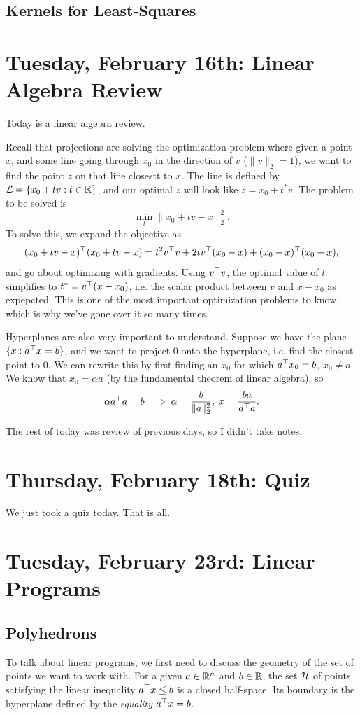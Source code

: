 \documentclass[11 pt]{scrartcl}
\begin{document}
\subsection{Kernels for Least-Squares}


\newpage
\section{Tuesday, February 16th: Linear Algebra Review}
Today is a linear algebra review.

Recall that projections are solving the optimization problem where given a point $x$, and some line going through $x_0$ in the direction of $v$ ($\|v\|_2 = 1$), we want to find the point $z$ on that line closestt to $x$. 
The line is defined by $\mathcal L = \{x_0 + tv : t\in \mathbb R\}$, and our optimal $z$ will look like $z = x_0 + t^* v$. 
The problem to be solved is 
\[ \min_t \|x_0 + tv - x\|_2^2.\] 
To solve this, we expand the objective as 
\[ (x_0+tv - x)^\top (x_0 + tv - x) =  t^2 v^\top v + 2tv^\top (x_0-x) + (x_0-x)^\top (x_0 - x) ,\]
and go about optimizing with gradients. 
Using $v^\top v$, the optimal value of $t$ simplifies to $t^* = v^\top (x-x_0)$, i.e. the scalar product between $v$ and $x-x_0$ as expepcted. 
This is one of the most important optimization problems to know, which is why we've gone over it so many times.

Hyperplanes are also very important to understand. 
Suppose we have the plane $\{x: a^\top x = b\}$, and we want to project $0$ onto the hyperplane, i.e. find the closest point to 0.
We can rewrite this by first finding an $x_0$ for which $a^\top x_0 = b$, $x_0\not= a$. 
We know that $x_0 = \alpha a$ (by the fundamental theorem of linear algebra), so 
\[ \alpha a^\top a = b \implies \alpha = \frac{b}{\|a\|_2^2},\; x = \frac{ba}{a^\top a}.\]

The rest of today was review of previous days, so I didn't take notes.

\section{Thursday, February 18th: Quiz}
We just took a quiz today. 
That is all. 


\newpage
\section{Tuesday, February 23rd: Linear Programs}

\subsection{Polyhedrons}
To talk about linear programs, we first need to discuss the geometry of the set of points we want to work with. 
For a given $a\in \mathbb R^n$ and $b\in \mathbb R$, the set $\mathcal H$ of points satisfying the linear inequality $a^\top x \leq b$ is a closed half-space. 
Its boundary is the hyperplane defined by the \emph{equality} $a^\top x = b$. 
\end{document}
